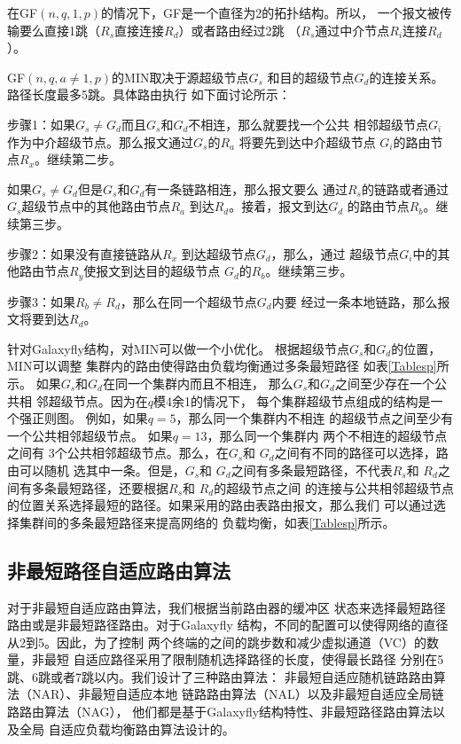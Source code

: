 在GF$(n,q,1,p)$的情况下，GF是一个直径为2的拓扑结构。所以，
一个报文被传输要么直接1跳（$R_s$直接连接$R_d$）或者路由经过2跳
（$R_s$通过中介节点$R_i$连接$R_d$）。

GF$(n,q,a\neq 1,p)$的MIN取决于源超级节点$G_s$
和目的超级节点$G_d$的连接关系。路径长度最多5跳。具体路由执行
如下面讨论所示：

步骤1：如果$G_s\neq G_d$而且$G_s$和$G_d$不相连，那么就要找一个公共
相邻超级节点$G_i$作为中介超级节点。那么报文通过$G_s$的$R_a$
将要先到达中介超级节点
$G_i$的路由节点$R_x$。继续第二步。

如果$G_s\neq G_d$但是$G_s$和$G_d$有一条链路相连，那么报文要么
通过$R_s$的链路或者通过$G_s$超级节点中的其他路由节点$R_a$
到达$R_d$。接着，报文到达$G_d$ 的路由节点$R_b$。继续第三步。

步骤2：如果没有直接链路从$R_x$ 到达超级节点$G_d$，那么，通过
超级节点$G_i$中的其他路由节点$R_y$使报文到达目的超级节点
$G_d$的$R_b$。继续第三步。

步骤3：如果$R_b \neq R_d$，那么在同一个超级节点$G_d$内要
经过一条本地链路，那么报文将要到达$R_d$。

针对Galaxyfly结构，对MIN可以做一个小优化。
根据超级节点$G_s$和$G_d$的位置，MIN可以调整
集群内的路由使得路由负载均衡通过多条最短路径
如表\ref{Tablesp}所示。
如果$G_s$和$G_d$在同一个集群内而且不相连，
那么$G_s$和$G_d$之间至少存在一个公共相
邻超级节点。因为在$q$模4余1的情况下，
每个集群超级节点组成的结构是一个强正则图。
例如，如果$q=5$，那么同一个集群内不相连
的超级节点之间至少有一个公共相邻超级节点。
如果$q=13$，那么同一个集群内
两个不相连的超级节点之间有
3个公共相邻超级节点。那么，在$G_s$和
$G_d$之间有不同的路径可以选择，路由可以随机
选其中一条。但是，$G_s$和
$G_d$之间有多条最短路径，不代表$R_s$和
$R_d$之间有多条最短路径，还要根据$R_s$和
$R_d$的超级节点之间
的连接与公共相邻超级节点的位置关系选择最短的路径。如果采用的路由表路由报文，那么我们
可以通过选择集群间的多条最短路径来提高网络的
负载均衡，如表\ref{Tablesp}所示。

\subsection{非最短路径自适应路由算法}

对于非最短自适应路由算法，我们根据当前路由器的缓冲区
状态来选择最短路径路由或是非最短路径路由。对于Galaxyfly
结构，不同的配置可以使得网络的直径从2到5。因此，为了控制
两个终端的之间的跳步数和减少虚拟通道（VC）的数量，非最短
自适应路径采用了限制随机选择路径的长度，使得最长路径
分别在5跳、6跳或者7跳以内。我们设计了三种路由算法：
非最短自适应随机链路路由算法（NAR）、非最短自适应本地
链路路由算法（NAL）以及非最短自适应全局链路路由算法（NAG），
他们都是基于Galaxyfly结构特性、非最短路径路由算法以及全局
自适应负载均衡路由算法设计的。

